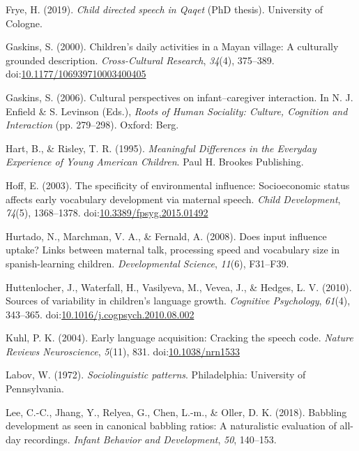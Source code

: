 \documentclass[,man,mask,floatsintext]{apa6}
\begin{document}
\hypertarget{ref-frye2019thesis}{}
Frye, H. (2019). \emph{Child directed speech in Qaqet} (PhD thesis).
University of Cologne.

\hypertarget{ref-gaskins2000childrens}{}
Gaskins, S. (2000). Children's daily activities in a Mayan village: A
culturally grounded description. \emph{Cross-Cultural Research},
\emph{34}(4), 375--389.
doi:\href{https://doi.org/10.1177/106939710003400405}{10.1177/106939710003400405}

\hypertarget{ref-gaskins2006cultural}{}
Gaskins, S. (2006). Cultural perspectives on infant--caregiver
interaction. In N. J. Enfield \& S. Levinson (Eds.), \emph{Roots of
Human Sociality: Culture, Cognition and Interaction} (pp. 279--298).
Oxford: Berg.

\hypertarget{ref-hart1995meaningful}{}
Hart, B., \& Risley, T. R. (1995). \emph{Meaningful Differences in the
Everyday Experience of Young American Children}. Paul H. Brookes
Publishing.

\hypertarget{ref-hoff2003specificity}{}
Hoff, E. (2003). The specificity of environmental influence:
Socioeconomic status affects early vocabulary development via maternal
speech. \emph{Child Development}, \emph{74}(5), 1368--1378.
doi:\href{https://doi.org/10.3389/fpsyg.2015.01492}{10.3389/fpsyg.2015.01492}

\hypertarget{ref-hurtado2008does}{}
Hurtado, N., Marchman, V. A., \& Fernald, A. (2008). Does input
influence uptake? Links between maternal talk, processing speed and
vocabulary size in spanish-learning children. \emph{Developmental
Science}, \emph{11}(6), F31--F39.

\hypertarget{ref-huttenlocher2010sources}{}
Huttenlocher, J., Waterfall, H., Vasilyeva, M., Vevea, J., \& Hedges, L.
V. (2010). Sources of variability in children's language growth.
\emph{Cognitive Psychology}, \emph{61}(4), 343--365.
doi:\href{https://doi.org/10.1016/j.cogpsych.2010.08.002}{10.1016/j.cogpsych.2010.08.002}

\hypertarget{ref-kuhl2004early}{}
Kuhl, P. K. (2004). Early language acquisition: Cracking the speech
code. \emph{Nature Reviews Neuroscience}, \emph{5}(11), 831.
doi:\href{https://doi.org/10.1038/nrn1533}{10.1038/nrn1533}

\hypertarget{ref-labov1972sociolinguistic}{}
Labov, W. (1972). \emph{Sociolinguistic patterns}. Philadelphia:
University of Pennsylvania.

\hypertarget{ref-lee2018babbling}{}
Lee, C.-C., Jhang, Y., Relyea, G., Chen, L.-m., \& Oller, D. K. (2018).
Babbling development as seen in canonical babbling ratios: A
naturalistic evaluation of all-day recordings. \emph{Infant Behavior and
Development}, \emph{50}, 140--153.
\end{document}
